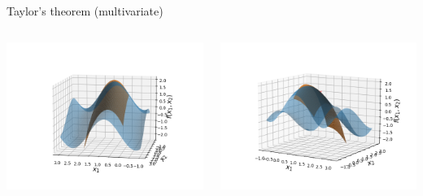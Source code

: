 \documentclass[11pt,compress,t,notes=noshow, xcolor=table]{beamer}
\begin{document}
\begin{vbframe}{Taylor's theorem (multivariate)}
\begin{columns}
    \begin{column}{0.4\textwidth}
        \includegraphics[width = \textwidth]{figure_man/Taylor2D/Taylor2D_2nd-100.png}
    \end{column}
    \begin{column}{0.4\textwidth}
        \includegraphics[width = \textwidth]{figure_man/Taylor2D/Taylor2D_2nd-301.png}
    \end{column}
\end{columns}  

\end{vbframe}
\end{document}
